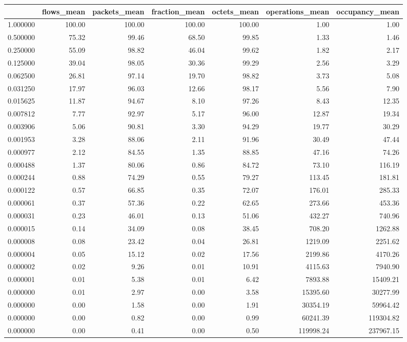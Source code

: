 \begin{tabular}{lrrrrrr}
\toprule
 & flows_mean & packets_mean & fraction_mean & octets_mean & operations_mean & occupancy_mean \\
\midrule
1.000000 & 100.00 & 100.00 & 100.00 & 100.00 & 1.00 & 1.00 \\
0.500000 & 75.32 & 99.46 & 68.50 & 99.85 & 1.33 & 1.46 \\
0.250000 & 55.09 & 98.82 & 46.04 & 99.62 & 1.82 & 2.17 \\
0.125000 & 39.04 & 98.05 & 30.36 & 99.29 & 2.56 & 3.29 \\
0.062500 & 26.81 & 97.14 & 19.70 & 98.82 & 3.73 & 5.08 \\
0.031250 & 17.97 & 96.03 & 12.66 & 98.17 & 5.56 & 7.90 \\
0.015625 & 11.87 & 94.67 & 8.10 & 97.26 & 8.43 & 12.35 \\
0.007812 & 7.77 & 92.97 & 5.17 & 96.00 & 12.87 & 19.34 \\
0.003906 & 5.06 & 90.81 & 3.30 & 94.29 & 19.77 & 30.29 \\
0.001953 & 3.28 & 88.06 & 2.11 & 91.96 & 30.49 & 47.44 \\
0.000977 & 2.12 & 84.55 & 1.35 & 88.85 & 47.16 & 74.26 \\
0.000488 & 1.37 & 80.06 & 0.86 & 84.72 & 73.10 & 116.19 \\
0.000244 & 0.88 & 74.29 & 0.55 & 79.27 & 113.45 & 181.81 \\
0.000122 & 0.57 & 66.85 & 0.35 & 72.07 & 176.01 & 285.33 \\
0.000061 & 0.37 & 57.36 & 0.22 & 62.65 & 273.66 & 453.36 \\
0.000031 & 0.23 & 46.01 & 0.13 & 51.06 & 432.27 & 740.96 \\
0.000015 & 0.14 & 34.09 & 0.08 & 38.45 & 708.20 & 1262.88 \\
0.000008 & 0.08 & 23.42 & 0.04 & 26.81 & 1219.09 & 2251.62 \\
0.000004 & 0.05 & 15.12 & 0.02 & 17.56 & 2199.86 & 4170.26 \\
0.000002 & 0.02 & 9.26 & 0.01 & 10.91 & 4115.63 & 7940.90 \\
0.000001 & 0.01 & 5.38 & 0.01 & 6.42 & 7893.88 & 15409.21 \\
0.000000 & 0.01 & 2.97 & 0.00 & 3.58 & 15395.60 & 30277.99 \\
0.000000 & 0.00 & 1.58 & 0.00 & 1.91 & 30354.19 & 59964.42 \\
0.000000 & 0.00 & 0.82 & 0.00 & 0.99 & 60241.39 & 119304.82 \\
0.000000 & 0.00 & 0.41 & 0.00 & 0.50 & 119998.24 & 237967.15 \\
\bottomrule
\end{tabular}
